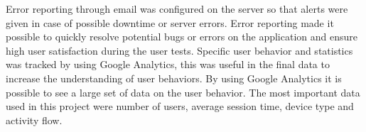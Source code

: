 Error reporting through email was configured on the server so that alerts were given in case of possible downtime or server errors. Error reporting made it possible to quickly resolve potential bugs or errors on the application and ensure high user satisfaction during the user tests. Specific user behavior and statistics was tracked by using Google Analytics, this was useful in the final data to increase the understanding of user behaviors. By using Google Analytics it is possible to see a large set of data on the user behavior. The most important data used in this project were number of users, average session time, device type and activity flow.  

\cleardoublepage